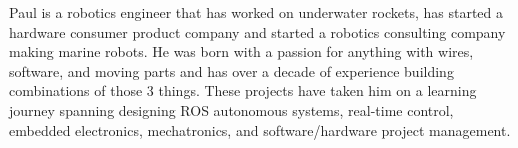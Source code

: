 

\begin{cvparagraph}

Paul is a robotics engineer that has worked on underwater rockets, has started a
hardware consumer product company and started a robotics consulting company
making marine robots. He was born with a passion for anything with wires,
software, and moving parts and has over a decade of experience building
combinations of those 3 things. These projects have taken him on a learning
journey spanning designing ROS autonomous systems, real-time control, embedded
electronics, mechatronics, and software/hardware project management.
\end{cvparagraph}
